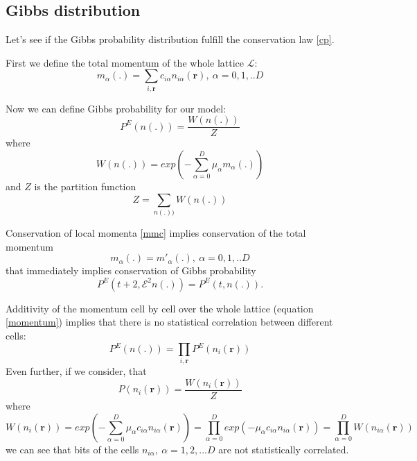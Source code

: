\subsection{Gibbs distribution}

Let's see if the Gibbs probability distribution fulfill the conservation law \ref{cp}.

First we define the total momentum of the whole lattice $\mathcal{L}$:
\begin{equation} \label{momentum}
m_{\alpha}(.) = \sum_{i,\bm{r}} c_{i\alpha} n_{i\alpha}(\bm{r}),~\alpha=0,1,..D
\end{equation}

Now we can define Gibbs probability for our model:
\begin{equation}
P^E(n(.)) = \frac{W(n(.))}{Z}
\end{equation}
where
\begin{equation}
W(n(.)) = exp(-\sum_{\alpha = 0}^D \mu_{\alpha} m_{\alpha}(.))
\end{equation} 
and $Z$ is the partition function
\begin{equation}
Z = \sum_{n(.))} W(n(.))
\end{equation}

Conservation of local momenta \ref{mmc} implies conservation of the total momentum
\begin{equation}
m_{\alpha}(.) = m'_{\alpha}(.),~\alpha=0,1,..D
\end{equation}
that immediately implies conservation of Gibbs probability
\begin{equation}
P^E(t+2,\mathcal{E}^2n(.)) = P^E(t,n(.)).
\end{equation}

Additivity of the momentum cell by cell over the whole lattice (equation \ref{momentum}) implies that there is no statistical correlation between different cells:
\begin{equation}
P^E(n(.)) = \prod_{i,\bm{r}} P^E(n_i(\bm{r}))
\end{equation} 
Even further, if we consider, that
\begin{equation}
P(n_i(\bm{r})) = \frac{W(n_i(\bm{r}))}{Z}
\end{equation}
where
\begin{equation}
W(n_i(\bm{r}))=exp(-\sum_{\alpha = 0}^D\mu_{\alpha}c_{i\alpha}n_{i\alpha}(\bm{r})) = \prod_{\alpha=0}^Dexp(-\mu_{\alpha}c_{i\alpha}n_{i\alpha}(\bm{r})) = \prod_{\alpha = 0}^D W(n_{i\alpha}(\bm{r}))
\end{equation}
we can see that bits of the cells $n_{i\alpha},~\alpha = 1,2,...D$ are not statistically correlated.

